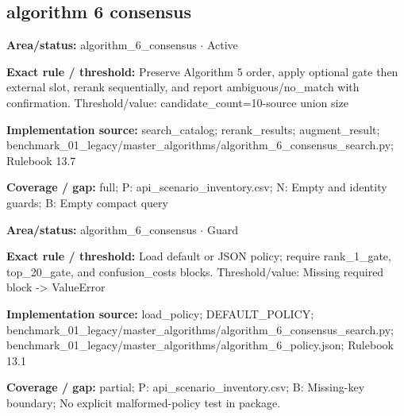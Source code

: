 \subsection*{algorithm 6 consensus}
\begin{tcolorbox}[enhanced,breakable,colback=white,colframe=Muted!45,boxrule=0.45pt,arc=1.5pt,left=6pt,right=6pt,top=5pt,bottom=5pt,title={\texttt{A6-ORDINARY-FLOW-08}},title after break={\texttt{A6-ORDINARY-FLOW-08}\ (continued)},fonttitle=\headingfont\bfseries\color{Navy},coltitle=Navy]
\textbf{Area/status:} algorithm\_\allowbreak{}6\_\allowbreak{}consensus $\boldsymbol{\cdot}$ Active\par
\smallskip
\textbf{Exact rule / threshold:} Preserve Algorithm 5 order, apply optional gate then external slot, rerank sequentially, and report ambiguous/\allowbreak{}no\_\allowbreak{}match with confirmation. Threshold/\allowbreak{}value: candidate\_\allowbreak{}count=10-source union size\par
\smallskip
\textbf{Implementation source:} search\_\allowbreak{}catalog; rerank\_\allowbreak{}results; augment\_\allowbreak{}result; benchmark\_\allowbreak{}01\_\allowbreak{}legacy/\allowbreak{}master\_\allowbreak{}algorithms/\allowbreak{}algorithm\_\allowbreak{}6\_\allowbreak{}consensus\_\allowbreak{}search.py; Rulebook 13.7\par
\smallskip
\textbf{Coverage / gap:} full; P: api\_\allowbreak{}scenario\_\allowbreak{}inventory.csv; N: Empty and identity guards; B: Empty compact query
\end{tcolorbox}
\begin{tcolorbox}[enhanced,breakable,colback=white,colframe=Muted!45,boxrule=0.45pt,arc=1.5pt,left=6pt,right=6pt,top=5pt,bottom=5pt,title={\texttt{A6-POLICY-LOAD-02}},title after break={\texttt{A6-POLICY-LOAD-02}\ (continued)},fonttitle=\headingfont\bfseries\color{Navy},coltitle=Navy]
\textbf{Area/status:} algorithm\_\allowbreak{}6\_\allowbreak{}consensus $\boldsymbol{\cdot}$ Guard\par
\smallskip
\textbf{Exact rule / threshold:} Load default or JSON policy; require rank\_\allowbreak{}1\_\allowbreak{}gate, top\_\allowbreak{}20\_\allowbreak{}gate, and confusion\_\allowbreak{}costs blocks. Threshold/\allowbreak{}value: Missing required block -> ValueError\par
\smallskip
\textbf{Implementation source:} load\_\allowbreak{}policy; DEFAULT\_\allowbreak{}POLICY; benchmark\_\allowbreak{}01\_\allowbreak{}legacy/\allowbreak{}master\_\allowbreak{}algorithms/\allowbreak{}algorithm\_\allowbreak{}6\_\allowbreak{}consensus\_\allowbreak{}search.py; benchmark\_\allowbreak{}01\_\allowbreak{}legacy/\allowbreak{}master\_\allowbreak{}algorithms/\allowbreak{}algorithm\_\allowbreak{}6\_\allowbreak{}policy.json; Rulebook 13.1\par
\smallskip
\textbf{Coverage / gap:} partial; P: api\_\allowbreak{}scenario\_\allowbreak{}inventory.csv; B: Missing-key boundary; No explicit malformed-policy test in package.
\end{tcolorbox}
